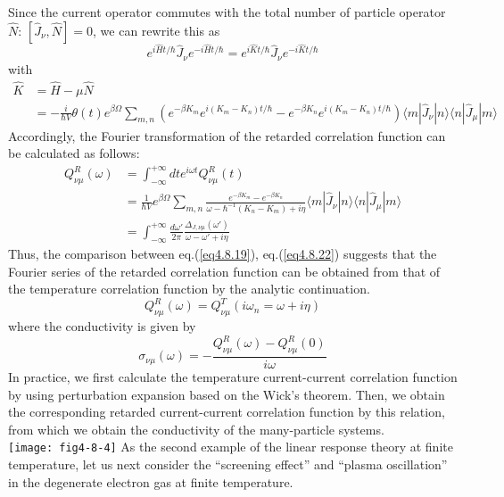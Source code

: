 Since the current operator commutes with the total number of particle operator $\hat N$: $[\hat J_\nu,\hat N]=0$, we can rewrite this as 
\[
e^{i\hat Ht/\hbar} \hat J_\nu e^{-i\hat Ht/\hbar} =e^{i\hat Kt/\hbar} \hat J_\nu e^{-i\hat Kt/\hbar} 
\]
with 
\[
\begin{aligned}
\hat K&=\hat H-\mu \hat N\\
&=-\frac{i}{\hbar V} \theta(t)e^{\beta\Omega} \sum_{m,n}\left( e^{-\beta K_m} e^{i(K_m-K_n)t/\hbar}-e^{-\beta K_n} e^{i(K_m-K_n)t/\hbar} \right)  \langle m|\hat J_\nu|n\rangle \langle n| \hat J_\mu|m\rangle
\end{aligned}
\]
Accordingly, the Fourier transformation of the retarded correlation function can be calculated as follows:
\begin{equation}\label{eq4.8.22}
\begin{aligned}
Q^R_{\nu\mu}(\omega)&=\int_{-\infty}^{+\infty} dte^{i\omega t} Q^R_{\nu\mu}(t)\\
&=\frac{1}{\hbar V}e^{\beta\Omega} \sum_{m,n} \frac{e^{-\beta K_m}-e^{-\beta K_n}}{\omega-\hbar^{-1}(K_n-K_m)+i\eta} \langle m|\hat J_\nu|n\rangle \langle n| \hat J_\mu|m\rangle\\
&=\int_{-\infty}^{+\infty} \frac{d\omega'}{2\pi} \frac{\Delta_{J,\nu\mu}(\omega')}{\omega-\omega'+i\eta}
\end{aligned}
\end{equation}
 Thus, the comparison between eq.(\ref{eq4.8.19}), eq.(\ref{eq4.8.22}) suggests that the Fourier series of the retarded correlation function can be obtained from that of the temperature correlation function by the analytic continuation.
\begin{equation}
Q^R_{\nu\mu} (\omega)=Q^T_{\nu\mu}(i\omega_n=\omega+i\eta)
\end{equation}
where the conductivity is given by
\begin{equation}
\sigma_{\nu\mu}(\omega)=-\frac{Q^R_{\nu\mu}(\omega)-Q^R_{\nu\mu}(0)}{i\omega}
\end{equation}
 In practice, we first calculate the temperature current-current correlation function by using perturbation expansion based on the Wick's theorem.
 Then, we obtain the corresponding retarded current-current correlation function by this relation, from which we obtain the conductivity of the many-particle systems.\\
\texttt{[image: fig4-8-4]}
 As the second example of the linear response theory at finite temperature, let us next consider the ``screening effect'' and ``plasma oscillation'' in the degenerate electron gas at finite temperature.










